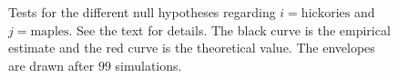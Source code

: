 \documentclass[12pt,a4paper,oneside,article]{memoir}
\begin{document}
\begin{figure}[htbp]
  \begin{adjustwidth}{-2in}{-2in}
	  \centering
  \end{adjustwidth}
  \caption{Tests for the different null hypotheses regarding $i=\text{hickories}$ and $j=\text{maples}$. See the text
  for details. The black curve is the empirical estimate and the red curve is the theoretical value. The envelopes are drawn after $99$ simulations.}
  \label{fig:nullh}
\end{figure}
\end{document}
